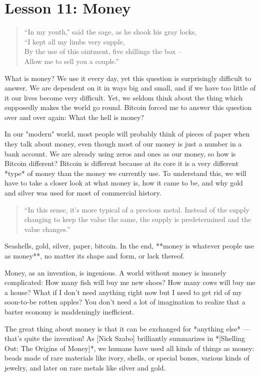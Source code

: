 \chapter{Lesson 11: Money}
\label{les:11}

\blockquote{
``In my youth,\'' said the sage, as he shook his gray locks, \\
``I kept all my limbs very supple, \\
By the use of this ointment, five shillings the box -- \\
Allow me to sell you a couple.''
}

What is money? We use it every day, yet this question is surprisingly
difficult to answer. We are dependent on it in ways big and small, and
if we have too little of it our lives become very difficult. Yet, we
seldom think about the thing which supposedly makes the world go round.
Bitcoin forced me to answer this question over and over again: What the
hell is money?

In our "modern" world, most people will probably think of pieces of
paper when they talk about money, even though most of our money is just
a number in a bank account. We are already using zeros and ones as our
money, so how is Bitcoin different? Bitcoin is different because at its
core it is a very different *type* of money than the money we currently
use. To understand this, we will have to take a closer look at what
money is, how it came to be, and why gold and silver was used for most
of commercial history.

\begin{quotation}
``In this sense, it's more typical of a precious metal. Instead of the
supply changing to keep the value the same, the supply is
predetermined and the value changes.''
\end{quotation}

Seashells, gold, silver, paper, bitcoin. In the end, **money is whatever
people use as money**, no matter its shape and form, or lack thereof.

Money, as an invention, is ingenious. A world without money is insanely
complicated: How many fish will buy me new shoes? How many cows will buy
me a house? What if I don't need anything right now but I need to get
rid of my soon-to-be rotten apples? You don't need a lot of imagination
to realize that a barter economy is maddeningly inefficient.

The great thing about money is that it can be exchanged for *anything
else* --- that's quite the invention! As [Nick Szabo] brilliantly
summarizes in *[Shelling Out: The Origins of Money]*, we humans have
used all kinds of things as money: beads made of rare materials like
ivory, shells, or special bones, various kinds of jewelry, and later on
rare metals like silver and gold.

